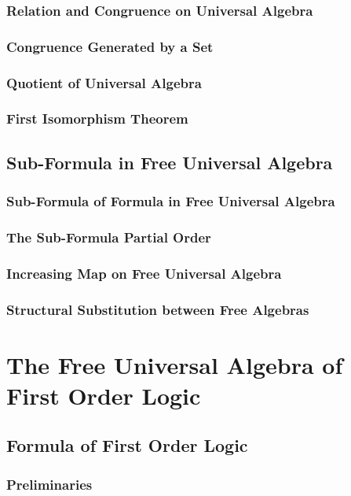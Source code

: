 \documentclass{report}
\begin{document}
    \subsection{Relation and Congruence on Universal Algebra}
      
    \subsection{Congruence Generated by a Set}
      
    \subsection{Quotient of Universal Algebra}
      
    \subsection{First Isomorphism Theorem}
      
\section{Sub-Formula in Free Universal Algebra}
    \subsection{Sub-Formula of Formula in Free Universal Algebra}
      
    \subsection{The Sub-Formula Partial Order}
      
    \subsection{Increasing Map on Free Universal Algebra}
      
    \subsection{Structural Substitution between Free Algebras}
      
\chapter{The Free Universal Algebra of First Order Logic}
\section{Formula of First Order Logic}
    \subsection{Preliminaries}
      
\end{document}
